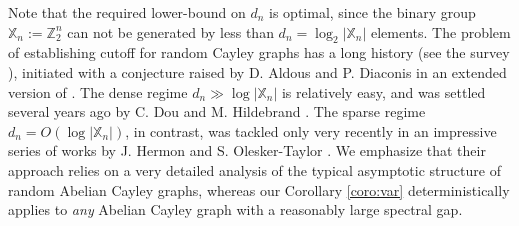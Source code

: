 \documentclass[12pt,final]{article}
\numberwithin{equation}{section}
\newcommand{\dZ}{\mathbb {Z}}
\newcommand{\dX}{\mathbb{X}}
\begin{document}
Note that the  required lower-bound on $d_n$ is optimal, since the binary group $\dX_n:=\dZ_2^n$ can not be generated by less than $d_n=\log_2|\dX_n|$ elements. The problem of establishing cutoff for random Cayley graphs has a long history (see the  survey \cite{MR2121795}), initiated with a conjecture raised by D. Aldous and P. Diaconis in an extended version of \cite{aldous1986shuffling}. The dense regime $d_n\gg\log |\dX_n|$ is relatively easy, and was settled several years ago by C. Dou and M. Hildebrand \cite{MR1404540,MR1296428}. The sparse regime $d_n=O(\log |\dX_n|)$, in contrast,  was tackled only very recently in an impressive series of works by J. Hermon and S. Olesker-Taylor  \cite{hermon2021cutoff,nonabelian,hermon2021results,hermon2021geometry}. We emphasize that their approach relies on a very detailed analysis of the typical asymptotic structure of random Abelian Cayley graphs, whereas  our Corollary \ref{coro:var} deterministically applies to \emph{any} Abelian Cayley graph with a reasonably large spectral gap. 
\end{document}

